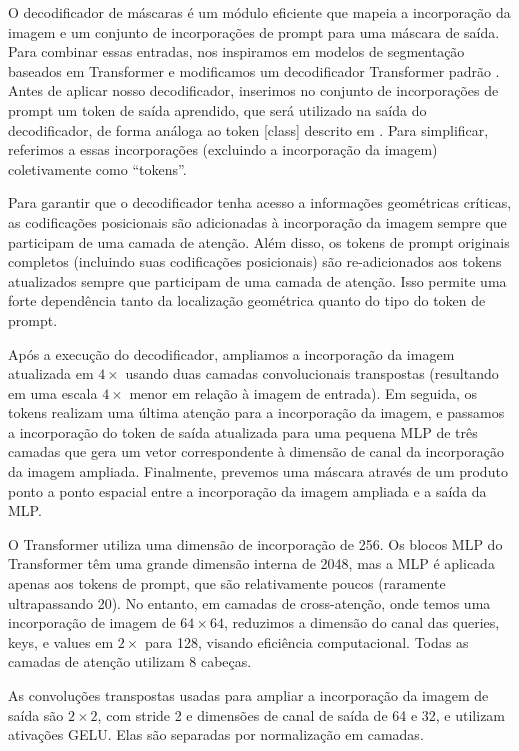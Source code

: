 O decodificador de máscaras é um módulo eficiente que mapeia a incorporação da imagem e um conjunto de incorporações de prompt para uma máscara de saída. Para combinar essas entradas, nos inspiramos em modelos de segmentação baseados em Transformer \cite{DBLP:journals/corr/abs-2005-12872}\cite{NEURIPS2021_950a4152} e modificamos um decodificador Transformer padrão \cite{DBLP:journals/corr/VaswaniSPUJGKP17}. Antes de aplicar nosso decodificador, inserimos no conjunto de incorporações de prompt um token de saída aprendido, que será utilizado na saída do decodificador, de forma análoga ao token [class] descrito em \cite{DBLP:journals/corr/VaswaniSPUJGKP17}. Para simplificar, referimos a essas incorporações (excluindo a incorporação da imagem) coletivamente como “tokens”.

Para garantir que o decodificador tenha acesso a informações geométricas críticas, as codificações posicionais são adicionadas à incorporação da imagem sempre que participam de uma camada de atenção. Além disso, os tokens de prompt originais completos (incluindo suas codificações posicionais) são re-adicionados aos tokens atualizados sempre que participam de uma camada de atenção. Isso permite uma forte dependência tanto da localização geométrica quanto do tipo do token de prompt.

Após a execução do decodificador, ampliamos a incorporação da imagem atualizada em \(4\times\) usando duas camadas convolucionais transpostas (resultando em uma escala \(4\times\) menor em relação à imagem de entrada). Em seguida, os tokens realizam uma última atenção para a incorporação da imagem, e passamos a incorporação do token de saída atualizada para uma pequena MLP de três camadas que gera um vetor correspondente à dimensão de canal da incorporação da imagem ampliada. Finalmente, prevemos uma máscara através de um produto ponto a ponto espacial entre a incorporação da imagem ampliada e a saída da MLP.

O Transformer utiliza uma dimensão de incorporação de 256. Os blocos MLP do Transformer têm uma grande dimensão interna de 2048, mas a MLP é aplicada apenas aos tokens de prompt, que são relativamente poucos (raramente ultrapassando 20). No entanto, em camadas de cross-atenção, onde temos uma incorporação de imagem de \(64 \times 64\), reduzimos a dimensão do canal das queries, keys, e values em \(2\times\) para 128, visando eficiência computacional. Todas as camadas de atenção utilizam 8 cabeças.

As convoluções transpostas usadas para ampliar a incorporação da imagem de saída são \(2 \times 2\), com stride 2 e dimensões de canal de saída de 64 e 32, e utilizam ativações GELU. Elas são separadas por normalização em camadas.

